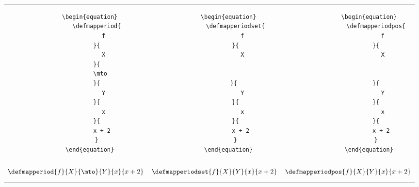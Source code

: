 \begin{widepar}
	\begin{tabular}{|c|c|c|}%
		\hline
		\begin{minipage}{0.3\textwidth}
			\begin{verbatim}
        \begin{equation}
            \defmapperiod{
                f
            }{
                X
            }{
                \mto  
            }{
                Y
            }{
                x
            }{
                x + 2 
            }
        \end{equation}
        \end{verbatim}
		\end{minipage}
		 &
		\begin{minipage}{0.3\textwidth}
			\begin{verbatim}
        \begin{equation}
            \defmapperiodset{
                f
            }{
                X


            }{ 
                Y
            }{
                x
            }{
                x + 2 
            }
        \end{equation}
        \end{verbatim}
		\end{minipage}
		 &
		\begin{minipage}{0.3\textwidth}
			\begin{verbatim}
            \begin{equation}
                \defmapperiodpos{
                    f
                }{
                    X


                }{
                    Y
                }{
                    x
                }{
                    x + 2 
                }
            \end{equation}
            \end{verbatim}
		\end{minipage}
		\\
		\begin{minipage}{0.3\textwidth}
			\begin{equation*}
				\defmapperiod{
					f
				}{
					X
				}{
					\mto
				}{
					Y
				}{
					x
				}{
					x + 2
				}
			\end{equation*}
		\end{minipage}
		 &
		\begin{minipage}{0.3\textwidth}
			\begin{equation*}
				\defmapperiodset{
					f
				}{
					X
				}{
					Y
				}{
					x
				}{
					x + 2
				}
			\end{equation*}
		\end{minipage}
		 &
		\begin{minipage}{0.3\textwidth}
			\begin{equation*}
				\defmapperiodpos{
					f
				}{
					X
				}{
					Y
				}{
					x
				}{
					x + 2
				}
			\end{equation*}
		\end{minipage}
		\\\hline
	\end{tabular}
\end{widepar}

